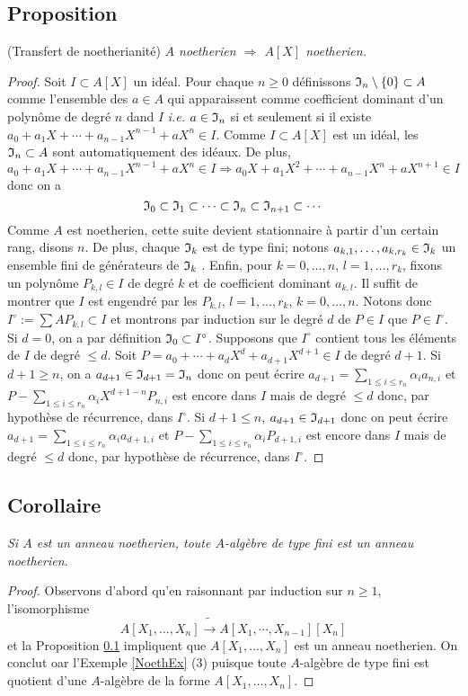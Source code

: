 \documentclass[a4paper, 12pt]{amsart}
\begin{document}
\subsection{Proposition}\label{NoethTransfert} (Transfert de noetherianité) \textit{$A$ noetherien $\Rightarrow$ $A[X]$ noetherien.}
\begin{proof}Soit $I\subset A[X]$ un idéal. Pour chaque $n\geq 0$ définissons $\frak{I}_n\setminus \lbrace 0\rbrace\subset A$ comme l'ensemble des $a\in A$ qui apparaissent comme coefficient dominant  d'un polynôme de degré $n$ dand $I$ \textit{i.e.} $a\in \frak{I}_n$ si et seulement si il existe $a_0+a_1X+\cdots+a_{n-1}X^{n-1}+aX^n\in I$. Comme $I\subset A[X]$ est un idéal, les $\frak{I}_n\subset A$ sont automatiquement des idéaux. De plus,  $$a_0+a_1X+\cdots+a_{n-1}X^{n-1}+aX^n\in I\Rightarrow a_0X+a_1X^2+\cdots+a_{n-1}X^{n}+aX^{n+1}\in I$$ donc on a 
$$\frak{I}_0\subset \frak{I}_1\subset \cdots\subset \frak{I}_n\subset \frak{I}_{n+1}\subset \cdots$$
Comme $A$ est noetherien, cette suite devient stationnaire à partir d'un certain rang, disons $n$. De plus,  chaque $\frak{I}_k$ est de type fini; notons $a_{k,1},\dots, a_{k,r_k}\in \frak{I}_k$ un ensemble fini de générateurs de $\frak{I}_k$ . Enfin,  pour  $k=0,\dots, n$, $l=1,\dots, r_k$, fixons un polynôme $P_{k,l}\in I$ de degré $k$ et de coefficient dominant $a_{k,l}$. Il suffit de montrer que $I$ est engendré par les $P_{k,l}$,  $l=1,\dots, r_k$, $k=0,\dots, n$. Notons donc $I^\circ:=\sum AP_{k,l}\subset I$ et montrons par induction sur le degré $d$ de $P\in I$ que $P\in I^\circ$. Si $d=0$, on a par définition $  \frak{I}_0\subset I^\circ$. Supposons que $I^\circ$ contient tous les   éléments de $I$ de degré $\leq d$. Soit $P=a_0+\cdots+a_dX^d+a_{d+1}X^{d+1}\in I$ de degré $d+1$. Si $d+1\geq n$, on a $a_{d+1}\in \frak{I}_{d+1}=\frak{I}_n$ donc on peut écrire $a_{d+1}=\sum_{1\leq i\leq r_n}\alpha_ia_{n,i}$ et $P-\sum_{1\leq i\leq r_n}\alpha_iX^{d+1-n}P_{n,i}$ est encore dans $I$ mais de degré $\leq d$ donc, par hypothèse de récurrence, dans $I^\circ$. Si $d+1\leq n$, $a_{d+1}\in \frak{I}_{d+1}$ donc on peut écrire $a_{d+1}=\sum_{1\leq i\leq r_n}\alpha_ia_{d+1,i}$ et $P-\sum_{1\leq i\leq r_n}\alpha_i P_{d+1,i}$ est encore dans $I$ mais de degré $\leq d$ donc, par hypothèse de récurrence, dans $I^\circ$. 
\end{proof}


\subsection{Corollaire}\label{NoethTransfertCor} \textit{Si $A$ est un anneau noetherien, toute $A$-algèbre de type fini est un anneau noetherien.}
\begin{proof} Observons d'abord qu'en raisonnant par induction sur $n\geq 1$,   l'isomorphisme $$A[X_1,\dots, X_n]\tilde{\rightarrow} A[X_1,\cdots,X_{n-1}] [X_n]$$ et la Proposition \ref{NoethTransfert} impliquent que $A[X_1,\dots, X_n]$ est un anneau noetherien. On conclut oar l'Exemple \ref{NoethEx} (3) puisque toute $A$-algèbre de type fini  est quotient d'une $A$-algèbre de la forme $A[X_1,\dots, X_n]$. \end{proof}
\end{document}
